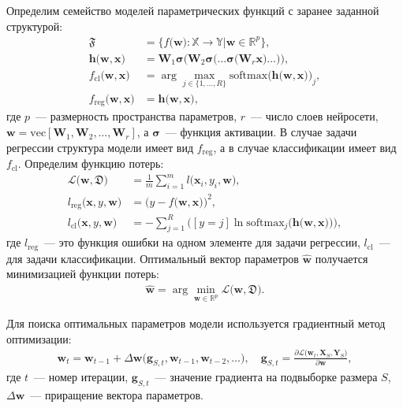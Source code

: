 Определим семейство моделей параметрических функций с заранее заданной структурой:
\[
    \label{ch-5:eq:st:2}
    \begin{aligned}
    \mathfrak{F} &= \bigl\{f\bigl(\textbf{w}\bigr):\mathbb{X} \to \mathbb{Y} | \textbf{w} \in \mathbb{R}^{p}\bigr\}, \\
    \mathbf{h}\bigl(\textbf{w}, \textbf{x}\bigr) &= \textbf{W}_1\bm{\sigma}\bigl(\textbf{W}_2\bm{\sigma}\bigl(\ldots\bm{\sigma}\bigl(\textbf{W}_r\textbf{x}\bigr)\ldots\bigr)\bigr),\\
    f_{\mathrm{cl}}\bigl(\textbf{w}, \textbf{x}\bigr) &= \arg \max_{j \in \bigl\{1,\ldots, R\bigr\}} \text{softmax}\bigl(\mathbf{h}\bigl(\textbf{w}, \textbf{x}\bigr)\bigr)_{j}, \\
    f_{\mathrm{reg}}\bigl(\textbf{w}, \textbf{x}\bigr) & = \mathbf{h}\bigl(\textbf{w}, \textbf{x}\bigr),
    \end{aligned}
\]
где $p$~--- размерность пространства параметров, $r$~--- число слоев нейросети, $\textbf{w} = \text{vec}[\textbf{W}_1, \textbf{W}_2, \ldots, \textbf{W}_r]$, а $\bm{\sigma}$~--- функция активации. В случае задачи регрессии структура модели имеет вид $f_{\mathrm{reg}}$, а в случае классификации имеет вид $f_{\mathrm{cl}}$.
Определим функцию потерь:
\[
    \label{ch-5:eq:st:3}
    \begin{aligned}
    \mathcal{L}\bigl(\textbf{w}, \mathfrak{D}\bigr) &= \frac{1}{m}\sum_{i=1}^{m}l\bigl(\textbf{x}_{i}, y_i, \textbf{w}\bigr),\\
    l_{\mathrm{reg}}\bigl(\textbf{x}, y, \textbf{w}\bigr) &= \bigl(y - f\bigl(\textbf{w}, \textbf{x}\bigr)\bigr)^{2},\\
    l_{\mathrm{cl}}\bigl(\textbf{x}, y, \textbf{w}\bigr) &= -\sum_{j=1}^{R}\bigl([y = j]\ln\text{softmax}_j\bigl(\mathbf{h}\bigl(\textbf{w}, \textbf{x}\bigr)\bigr)\bigr),
    \end{aligned}
\]
где $l_{\mathrm{reg}}$~--- это функция ошибки на одном элементе для задачи регрессии, $l_{\mathrm{cl}}$~--- для задачи классификации.
Оптимальный вектор параметров $\hat{\textbf{w}}$ получается минимизацией функции потерь:
\[
    \label{ch-5:eq:st:0:1}
    \begin{aligned}
    \hat{\textbf{w}} = \arg \min_{\textbf{w}\in\mathbb{R}^{p}} \mathcal{L}\bigl(\textbf{w}, \mathfrak{D}\bigr).
    \end{aligned}
\]

Для поиска оптимальных параметров модели используется градиентный метод оптимизации:
\begin{equation}
    \label{ch-5:eq:st:4}
    \begin{aligned}
    \textbf{w}_{t} = \textbf{w}_{t-1} + \Delta\textbf{w}\bigl(\textbf{g}_{S,t}, \textbf{w}_{t-1}, \textbf{w}_{t-2}, \ldots\bigr), \quad \textbf{g}_{S,t}=\frac{\partial \mathcal{L}\bigl(\textbf{w}_{t}, \textbf{X}_{S}, \textbf{Y}_{S}\bigr)}{\partial \textbf{w}},
    \end{aligned}
\end{equation}
где $t$~--- номер итерации, $\textbf{g}_{S,t}$~--- значение градиента на подвыборке размера $S$, $\Delta\textbf{w}$~--- приращение вектора параметров.


